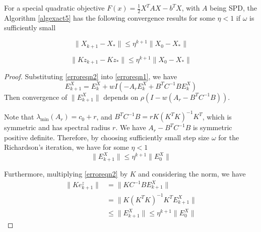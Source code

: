 \begin{itemize}
\begin{theorem}
For a special quadratic objective $F(x) = \frac{1}{2} X^T A X - b^TX$, with $A$ being SPD, the Algorithm \ref{algexact5} has the following convergence results for some $\eta<1$ if $\omega$ is sufficiently small

\begin{equation}
    \|X_{k+1} - X_*\| \leq \eta^{k+1} \|X_{0} - X_* \| 
\end{equation}

\begin{equation}
    \|Kz_{k+1} - K z_*\| \leq \eta^{k+1} \|X_{0} - X_* \| 
\end{equation}
\end{theorem}

\begin{proof}
Substituting \eqref{erroreqn2} into \eqref{erroreqn1}, we have 
\begin{equation}
    E^X_{k+1} = E^X_{k} + wI\left( -A_rE^X_{k} + B^T C^{-1} B E^X_{k} \right)
\end{equation}
Then convergence of $\|E^X_{k+1} \|$ depends on $\rho(I  - w ( A_r - B^T C^{-1}B) )$. 

Note that $\lambda_{\text{min}}(A_r) = c_0 + r$, and $B^T C^{-1} B = r K (K^TK)^{-1} K^T$, which is symmetric and has spectral radius $r$. We have $A_r - B^T C^{-1} B$ is symmetric positive definite. Therefore, by choosing sufficiently small step size $\omega$ for the Richardson's iteration, we have for some $\eta < 1$
\begin{equation}
    \|E^X_{k+1}\| \leq \eta^{k+1} \|E^X_{0} \| 
\end{equation}

Furthermore, multiplying \eqref{erroreqn2} by $K$ and considering the norm, we have 
\begin{equation}
    \begin{aligned}
       \|Ke^z_{k+1} \| &= \|KC^{-1}B E^X_{k+1}\| \\
        & = \| K(K^T K)^{-1} K^T  E^X_{k+1}\| \\
        & \leq \|E^X_{k+1}\|  \leq \eta^{k+1} \|E^X_{0} \| 
    \end{aligned}
\end{equation}
\end{proof}





\end{itemize}
